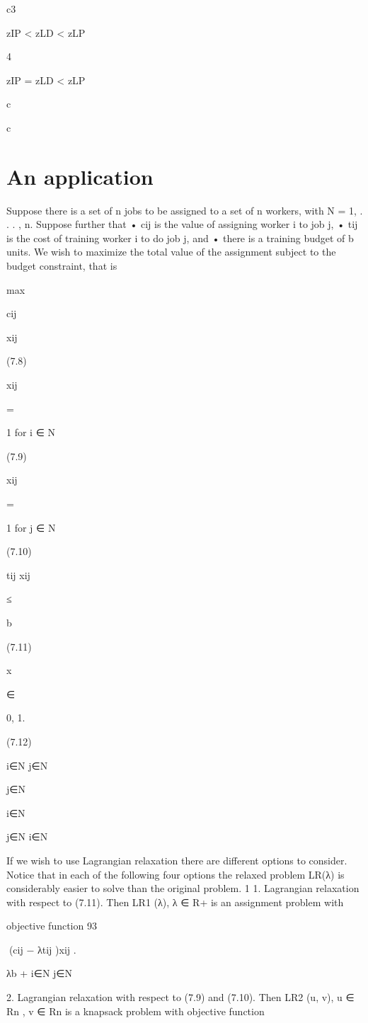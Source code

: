 c3

zIP < zLD < zLP

4

zIP = zLD < zLP

c

c

\section{An application}

Suppose there is a set of n jobs to be assigned to a set of n workers, with N = {1, . . . , n}. Suppose
further that
• cij is the value of assigning worker i to job j,
• tij is the cost of training worker i to do job j, and
• there is a training budget of b units.
We wish to maximize the total value of the assignment subject to the budget constraint, that is

max

cij

xij

(7.8)

xij

=

1 for i ∈ N

(7.9)

xij

=

1 for j ∈ N

(7.10)

tij xij

≤

b

(7.11)

x

∈

{0, 1}.

(7.12)

i∈N j∈N

j∈N

i∈N

j∈N i∈N

If we wish to use Lagrangian relaxation there are different options to consider. Notice that in each of
the following four options the relaxed problem LR(λ) is considerably easier to solve than the original
problem.
1
1. Lagrangian relaxation with respect to (7.11). Then LR1 (λ), λ ∈ R+
is an assignment problem with

objective function
93

(cij − λtij )xij .

λb +
i∈N j∈N

2. Lagrangian relaxation with respect to (7.9) and (7.10). Then LR2 (u, v), u ∈ Rn , v ∈ Rn is a
knapsack problem with objective function

